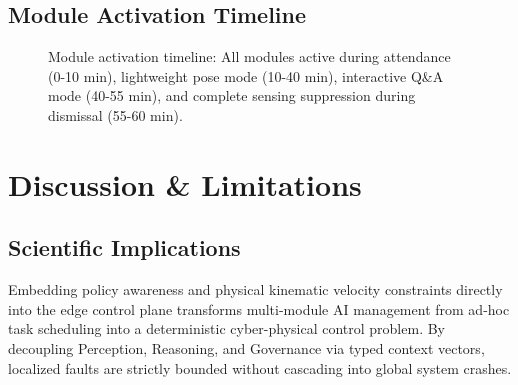 \documentclass[conference]{IEEEtran}
\begin{document}
\subsection{Module Activation Timeline}
\begin{figure}[htbp]
\centering
{}
\caption{Module activation timeline: All modules active during attendance (0-10 min), lightweight pose mode (10-40 min), interactive Q\&A mode (40-55 min), and complete sensing suppression during dismissal (55-60 min).}
\label{fig:timeline}
\end{figure}

\section{Discussion \& Limitations}

\subsection{Scientific Implications}
Embedding policy awareness and physical kinematic velocity constraints directly into the edge control plane transforms multi-module AI management from ad-hoc task scheduling into a deterministic cyber-physical control problem. By decoupling Perception, Reasoning, and Governance via typed context vectors, localized faults are strictly bounded without cascading into global system crashes.
\end{document}
